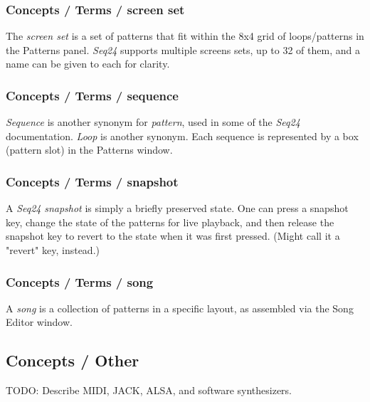 \subsubsection{Concepts / Terms / screen set}
\label{subsubsec:concepts_terms_screen_set}

   The \textsl{screen set}
   is a set of patterns that fit within the 8x4 grid of loops/patterns in the
   Patterns panel.
   \textsl{Seq24} supports multiple screens sets, up to 32 of them,
   and a name can be given to each for clarity.

\subsubsection{Concepts / Terms / sequence}
\label{subsubsec:concepts_terms_sequence}

   \textsl{Sequence} is
   another synonym for \textsl{pattern}, used in some of the \textsl{Seq24}
   documentation.  \textsl{Loop} is another synonym.
   Each sequence is represented by a box (pattern slot) in the Patterns window.

\subsubsection{Concepts / Terms / snapshot}
\label{subsubsec:concepts_terms_snapshot}

   A \textsl{Seq24} \textsl{snapshot} is simply a briefly preserved state.
   One can press a snapshot key, change the state of the patterns for live
   playback, and then release the snapshot key to revert to the state when
   it was first pressed.  (Might call it a "revert" key, instead.)

\subsubsection{Concepts / Terms / song}
\label{subsubsec:concepts_terms_song}

   A \textsl{song} is a collection of patterns in a specific layout, as
   assembled via the Song Editor window.

\subsection{Concepts / Other}
\label{subsec:concepts_other}

TODO: Describe MIDI, JACK, ALSA, and software synthesizers.

